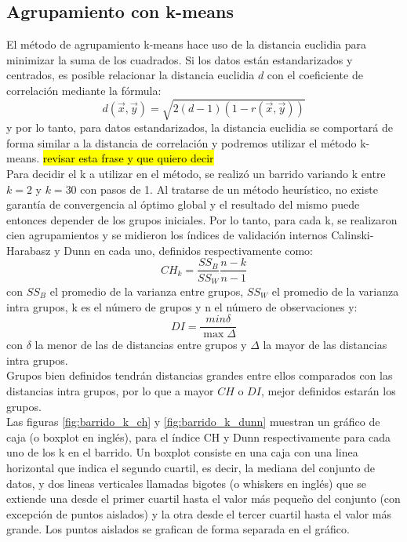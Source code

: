 \subsection{Agrupamiento con k-means}
El método de agrupamiento k-means hace uso de la distancia euclidia para minimizar la suma de los cuadrados. Si los datos están estandarizados y centrados, es posible relacionar la distancia euclidia $d$ con el coeficiente de correlación mediante la fórmula:
\begin{equation}
	d(\vec{x}, \vec{y}) = \sqrt{2(d-1)(1-r(\vec{x}, \vec{y}))}
\end{equation}
y por lo tanto, para datos estandarizados, la distancia euclidia se comportará de forma similar a la distancia de correlación y podremos utilizar el método k-means. \hl{revisar esta frase y que quiero decir}\\
Para decidir el k a utilizar en el método, se realizó un barrido variando k entre $k=2$ y $k=30$ con pasos de 1. Al tratarse de un método heurístico, no existe garantía de convergencia al óptimo global y el resultado del mismo puede entonces depender de los grupos iniciales. Por lo tanto, para cada k, se realizaron cien agrupamientos y se midieron los índices de validación internos Calinski-Harabasz y Dunn en cada uno, definidos respectivamente como:
\begin{equation}
	CH_k = \frac{SS_B}{SS_W}\frac{n-k}{n-1}
\end{equation}
con $SS_B$ el promedio de la varianza entre grupos, $SS_W$ el promedio de la varianza intra grupos, k es el número de grupos y n el número de observaciones y:
\begin{equation}
	DI = \frac{min\delta}{\max\Delta}
\end{equation}
con $\delta$ la menor de las de distancias entre grupos y $\Delta$ la mayor de las distancias intra grupos.\\
Grupos bien definidos tendrán distancias grandes entre ellos comparados con las distancias intra grupos, por lo que a mayor $CH$ o $DI$, mejor definidos estarán los grupos.\\
Las figuras \ref{fig:barrido_k_ch} y \ref{fig:barrido_k_dunn} muestran un gráfico de caja (o boxplot en inglés), para el índice CH y Dunn respectivamente para cada uno de los k en el barrido. Un boxplot consiste en una caja con una linea horizontal que indica el segundo cuartil, es decir, la mediana del conjunto de datos, y dos lineas verticales llamadas bigotes (o whiskers en inglés) que se extiende una desde el primer cuartil hasta el valor más pequeño del conjunto (con excepción de puntos aislados) y la otra desde el tercer cuartil hasta el valor más grande. Los puntos aislados se grafican de forma separada en el gráfico.
